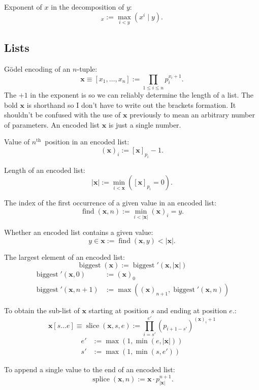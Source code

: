\documentclass[a4paper]{article}
\newcommand{\nth}{$n^{\textrm{th}}$~}	%
\newcommand{\xvec}{\mathbf{x}}	%
\newcommand{\recurN}[1]{\begin{equation*} \begin{split} #1 \end{split} \end{equation*}}	%
\theoremstyle{plain}
\theoremstyle{definition}
\begin{document}
Exponent of $x$ in the decomposition of $y$:
\begin{equation} [y]_x := \max_{i < y} \left( x^i \mid y \right). \end{equation}

\subsection{Lists}

G\"odel encoding of an $n$-tuple:
\begin{equation} \xvec \equiv [x_1, \dots, x_n] := \prod_{1 \leq i \leq n} p_i^{x_i+1}. \end{equation}
The $+1$ in the exponent is so we can reliably determine the length of a list. The bold $\xvec$ is shorthand so I don't have to write out the brackets formation. It shouldn't be confused with the use of $\xvec$ previously to mean an arbitrary number of parameters. An encoded list $\xvec$ is just a single number.

Value of \nth position in an encoded list:
\begin{equation} (\xvec)_i := [\xvec]_{p_i} - 1. \end{equation}

Length of an encoded list:
\begin{equation} |\xvec| := \min_{i < \xvec} \left([\xvec]_{p_i} = 0  \right).\end{equation}

The index of the first occurrence of a given value in an encoded list:
\begin{equation} \operatorname{find}(\xvec,n) := \min_{i < |\xvec|} (\xvec)_i = y. \end{equation}

Whether an encoded list contains a given value:
\begin{equation} y \in \xvec := \operatorname{find}(\xvec,y) < |\xvec|. \end{equation}

The largest element of an encoded list:
\begin{equation} \operatorname{biggest}(\xvec) := \operatorname{biggest}'(\xvec,|\xvec|) \end{equation}
\recurN{
	\operatorname{biggest}'(\xvec,0) &:= (\xvec)_0 \\ 
	\operatorname{biggest}'(\xvec,n+1) &:= \max \left ( (\xvec)_{n+1},\operatorname{biggest}'(\xvec,n) \right )
}

To obtain the sub-list of $\xvec$ starting at position $s$ and ending at position $e$.:
\begin{equation} \xvec[s \dots e] \equiv \operatorname{slice}(\xvec,s,e) := \prod_{i=s'}^{e'}(p_{i+1-s'})^{(\xvec)_i+1} \end{equation}
\begin{equation*} 
\begin{split}
	e' &:= \max(1,\min(e,|\xvec|)) \\ 
	s' &:= \max(1,\min(s,e')) 
\end{split}
\end{equation*}

To append a single value to the end of an encoded list:
\begin{equation} \operatorname{splice}(\xvec,n) := \xvec \cdot p_{|\xvec|}^{n+1}. \end{equation}
\end{document}
